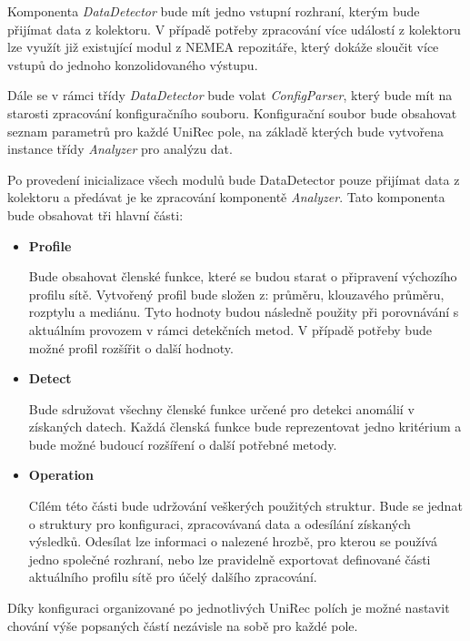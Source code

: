  Komponenta \textit{DataDetector} bude mít jedno vstupní rozhraní, kterým bude přijímat data z kolektoru.
 V případě potřeby
 zpracování více událostí z kolektoru lze využít již existující modul z NEMEA repozitáře, který
 dokáže sloučit více vstupů do jednoho konzolidovaného výstupu. 
 
 Dále se v rámci třídy \textit{DataDetector} bude volat \textit{ConfigParser}, který bude mít na starosti zpracování 
 konfiguračního souboru. Konfigurační soubor bude obsahovat seznam parametrů pro každé UniRec pole,
 na základě kterých bude vytvořena instance třídy \textit{Analyzer} pro analýzu dat. 
 
 Po provedení inicializace všech modulů bude DataDetector pouze přijímat data z kolektoru a 
 předávat je ke zpracování komponentě \textit{Analyzer}. Tato komponenta bude obsahovat
 tři hlavní části:
 \begin{itemize}
  \item \textbf{Profile}
  
  Bude obsahovat členské funkce, které se budou starat o připravení výchozího profilu sítě. 
  Vytvořený profil bude složen z: průměru, klouzavého průměru, rozptylu a mediánu.
  Tyto hodnoty budou následně použity při porovnávání s aktuálním provozem v rámci detekčních
  metod. V případě potřeby bude možné profil rozšířit o další hodnoty.
  
  \item \textbf{Detect}
  
  Bude sdružovat všechny členské funkce určené pro detekci anomálií v získaných datech. 
  Každá členská funkce bude reprezentovat jedno kritérium a bude možné budoucí rozšíření o další
  potřebné metody.
  
  \item \textbf{Operation}
  
  Cílém této části bude udržování veškerých použitých struktur. Bude se jednat o struktury 
  pro konfiguraci, zpracovávaná data a odesílání získaných výsledků. Odesílat lze informaci o 
  nalezené hrozbě, pro kterou se používá jedno společné rozhraní, nebo lze pravidelně exportovat
  definované části aktuálního profilu sítě pro účelý dalšího zpracování. 
  
 \end{itemize}

 Díky konfiguraci organizované po jednotlivých UniRec polích je možné nastavit chování výše
 popsaných částí nezávisle na sobě pro každé pole.
 
